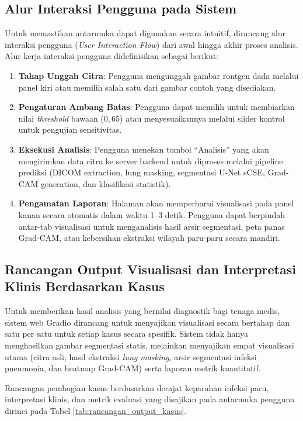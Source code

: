 \documentclass[12pt,a4paper,oneside]{book}
\begin{document}
\subsection{Alur Interaksi Pengguna pada Sistem}

Untuk memastikan antarmuka dapat digunakan secara intuitif, dirancang alur interaksi pengguna (\textit{User Interaction Flow}) dari awal hingga akhir proses analisis. Alur kerja interaksi pengguna didefinisikan sebagai berikut:

\begin{enumerate}
  \item \textbf{Tahap Unggah Citra}: Pengguna mengunggah gambar rontgen dada melalui panel kiri atau memilih salah satu dari gambar contoh yang disediakan.
  \item \textbf{Pengaturan Ambang Batas}: Pengguna dapat memilih untuk membiarkan nilai \textit{threshold} bawaan ($0,65$) atau menyesuaikannya melalui slider kontrol untuk pengujian sensitivitas.
  \item \textbf{Eksekusi Analisis}: Pengguna menekan tombol ``Analisis'' yang akan mengirimkan data citra ke server backend untuk diproses melalui pipeline prediksi (DICOM extraction, lung masking, segmentasi U-Net sCSE, Grad-CAM generation, dan klasifikasi statistik).
  \item \textbf{Pengamatan Laporan}: Halaman akan memperbarui visualisasi pada panel kanan secara otomatis dalam waktu 1--3 detik. Pengguna dapat berpindah antar-tab visualisasi untuk menganalisis hasil arsir segmentasi, peta panas Grad-CAM, atau kebersihan ekstraksi wilayah paru-paru secara mandiri.
\end{enumerate}

\subsection{Rancangan Output Visualisasi dan Interpretasi Klinis Berdasarkan Kasus}

Untuk memberikan hasil analisis yang bernilai diagnostik bagi tenaga medis, sistem web Gradio dirancang untuk menyajikan visualisasi secara bertahap dan satu per satu untuk setiap kasus secara spesifik. Sistem tidak hanya menghasilkan gambar segmentasi statis, melainkan menyajikan empat visualisasi utama (citra asli, hasil ekstraksi \textit{lung masking}, arsir segmentasi infeksi pneumonia, dan heatmap Grad-CAM) serta laporan metrik kuantitatif.

Rancangan pembagian kasus berdasarkan derajat keparahan infeksi paru, interpretasi klinis, dan metrik evaluasi yang disajikan pada antarmuka pengguna dirinci pada Tabel \ref{tab:rancangan_output_kasus}.
\end{document}
